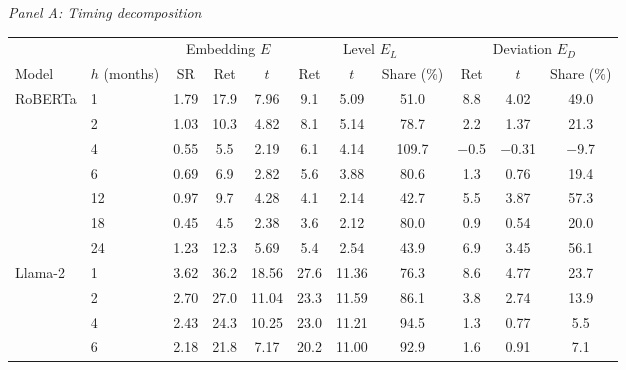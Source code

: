 \begin{table}[htbp]
{\footnotesize
\textit{Panel A: Timing decomposition}\\[2pt]
\begin{adjustbox}{max width=\linewidth, max totalheight=0.28\textheight}
\begin{tabular}{llccccccccc}
\toprule
\multicolumn{2}{c}{} & \multicolumn{3}{c}{Embedding $E$} & \multicolumn{3}{c}{Level $E_L$} & \multicolumn{3}{c}{Deviation $E_D$} \\
\cmidrule(lr){3-5} \cmidrule(lr){6-8} \cmidrule(lr){9-11}
Model & $h$ (months) & SR & Ret & $t$ & Ret & $t$ & Share (\%) & Ret & $t$ & Share (\%) \\
\midrule
RoBERTa & 1 & 1.79 & 17.9 & \phantom{0}7.96 & \phantom{0}9.1 & \phantom{0}5.09 & \phantom{0}51.0 & \phantom{$-$}8.8 & \phantom{$-$}4.02 & \phantom{$-$}49.0 \\
 & 2 & 1.03 & 10.3 & \phantom{0}4.82 & \phantom{0}8.1 & \phantom{0}5.14 & \phantom{0}78.7 & \phantom{$-$}2.2 & \phantom{$-$}1.37 & \phantom{$-$}21.3 \\
 & 4 & 0.55 & \phantom{0}5.5 & \phantom{0}2.19 & \phantom{0}6.1 & \phantom{0}4.14 & 109.7 & $-$0.5 & $-$0.31 & \phantom{0}$-$9.7 \\
 & 6 & 0.69 & \phantom{0}6.9 & \phantom{0}2.82 & \phantom{0}5.6 & \phantom{0}3.88 & \phantom{0}80.6 & \phantom{$-$}1.3 & \phantom{$-$}0.76 & \phantom{$-$}19.4 \\
 & 12 & 0.97 & \phantom{0}9.7 & \phantom{0}4.28 & \phantom{0}4.1 & \phantom{0}2.14 & \phantom{0}42.7 & \phantom{$-$}5.5 & \phantom{$-$}3.87 & \phantom{$-$}57.3 \\
 & 18 & 0.45 & \phantom{0}4.5 & \phantom{0}2.38 & \phantom{0}3.6 & \phantom{0}2.12 & \phantom{0}80.0 & \phantom{$-$}0.9 & \phantom{$-$}0.54 & \phantom{$-$}20.0 \\
 & 24 & 1.23 & 12.3 & \phantom{0}5.69 & \phantom{0}5.4 & \phantom{0}2.54 & \phantom{0}43.9 & \phantom{$-$}6.9 & \phantom{$-$}3.45 & \phantom{$-$}56.1 \\
\midrule
Llama-2 & 1 & 3.62 & 36.2 & 18.56 & 27.6 & 11.36 & \phantom{0}76.3 & \phantom{$-$}8.6 & \phantom{$-$}4.77 & \phantom{$-$}23.7 \\
 & 2 & 2.70 & 27.0 & 11.04 & 23.3 & 11.59 & \phantom{0}86.1 & \phantom{$-$}3.8 & \phantom{$-$}2.74 & \phantom{$-$}13.9 \\
 & 4 & 2.43 & 24.3 & 10.25 & 23.0 & 11.21 & \phantom{0}94.5 & \phantom{$-$}1.3 & \phantom{$-$}0.77 & \phantom{$-$0}5.5 \\
 & 6 & 2.18 & 21.8 & \phantom{0}7.17 & 20.2 & 11.00 & \phantom{0}92.9 & \phantom{$-$}1.6 & \phantom{$-$}0.91 & \phantom{$-$0}7.1 \\

\end{tabular}
\end{adjustbox}}
\end{table}
